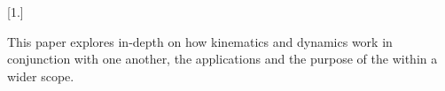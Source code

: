 \documentclass[12pt]{article}
\begin{document}

[1.] \parencite{kinematics} \par This paper explores in-depth on how kinematics and dynamics work in conjunction with one another,
the applications and the purpose of the  within a wider scope.


\printbibliography
\end{document}
